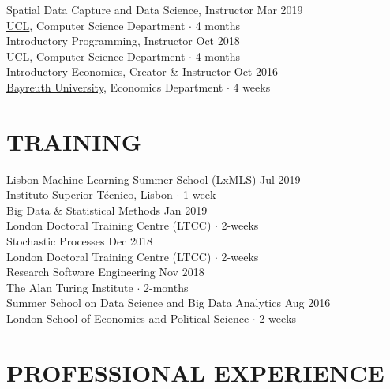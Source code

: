 \documentclass{cv}
\begin{document}
Spatial Data Capture and Data Science, Instructor \hfill Mar 2019 \\
{\color{lightgray} \href{https://www.ucl.ac.uk/}{UCL}, Computer Science Department $\cdot$ 4 months} \\

Introductory Programming, Instructor \hfill Oct 2018 \\
{\color{lightgray} \href{https://www.ucl.ac.uk/}{UCL}, Computer Science Department $\cdot$ 4 months}  \\

Introductory Economics, Creator \& Instructor \hfill Oct 2016 \\
{\color{lightgray} \href{https://www.uni-bayreuth.de/en/}{Bayreuth University}, Economics Department $\cdot$ 4 weeks} 

\section{TRAINING}

\href{http://lxmls.it.pt/}{Lisbon Machine Learning Summer School} (LxMLS) \hfill Jul 2019 \\
{\color{lightgray} Instituto Superior Técnico, Lisbon $\cdot$ 1-week} \\

Big Data \& Statistical Methods \hfill Jan 2019  \\
{\color{lightgray} London Doctoral Training Centre (LTCC) $\cdot$ 2-weeks} \\

Stochastic Processes \hfill Dec 2018  \\
{\color{lightgray} London Doctoral Training Centre (LTCC) $\cdot$ 2-weeks} \\

Research Software Engineering \hfill Nov 2018 \\
{\color{lightgray} The Alan Turing Institute $\cdot$ 2-months} \\

Summer School on Data Science and Big Data Analytics \hfill Aug 2016 \\
{\color{lightgray} London School of Economics and Political Science $\cdot$ 2-weeks} \\

\section{PROFESSIONAL EXPERIENCE}
\end{document}
